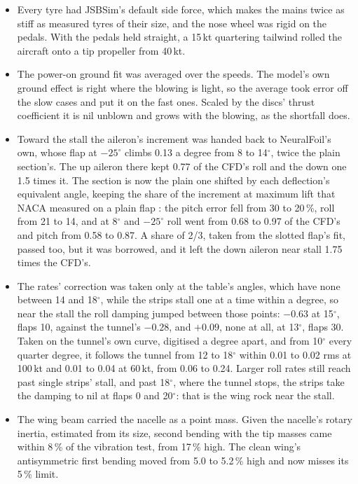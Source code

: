 \documentclass[10pt,a4paper,twocolumn]{article}
\begin{document}
\begin{itemize}
\item Every tyre had JSBSim's default side force, which makes the mains twice as stiff as measured tyres of their size, and the nose wheel was rigid on the pedals. With the pedals held straight, a 15\,kt quartering tailwind rolled the aircraft onto a tip propeller from 40\,kt.
\item The power-on ground fit was averaged over the speeds. The model's own ground effect is right where the blowing is light, so the average took error off the slow cases and put it on the fast ones. Scaled by the discs' thrust coefficient it is nil unblown and grows with the blowing, as the shortfall does.
\item Toward the stall the aileron's increment was handed back to NeuralFoil's own, whose flap at $-25^\circ$ climbs 0.13 a degree from 8 to 14$^\circ$, twice the plain section's. The up aileron there kept 0.77 of the CFD's roll and the down one 1.5 times it. The section is now the plain one shifted by each deflection's equivalent angle, keeping the share of the increment at maximum lift that NACA measured on a plain flap \cite{n661}: the pitch error fell from 30 to 20\,\%, roll from 21 to 14, and at 8$^\circ$ and $-25^\circ$ roll went from 0.68 to 0.97 of the CFD's and pitch from 0.58 to 0.87. A share of 2/3, taken from the slotted flap's fit, passed too, but it was borrowed, and it left the down aileron near stall 1.75 times the CFD's.
\item The rates' correction was taken only at the table's angles, which have none between 14 and 18$^\circ$, while the strips stall one at a time within a degree, so near the stall the roll damping jumped between those points: $-0.63$ at 15$^\circ$, flaps 10, against the tunnel's $-0.28$, and $+0.09$, none at all, at 13$^\circ$, flaps 30. Taken on the tunnel's own curve, digitised a degree apart, and from 10$^\circ$ every quarter degree, it follows the tunnel from 12 to 18$^\circ$ within 0.01 to 0.02 rms at 100\,kt and 0.01 to 0.04 at 60\,kt, from 0.06 to 0.24. Larger roll rates still reach past single strips' stall, and past 18$^\circ$, where the tunnel stops, the strips take the damping to nil at flaps 0 and 20$^\circ$: that is the wing rock near the stall.
\item The wing beam carried the nacelle as a point mass. Given the nacelle's rotary inertia, estimated from its size, second bending with the tip masses came within 8\,\% of the vibration test, from 17\,\% high. The clean wing's antisymmetric first bending moved from 5.0 to 5.2\,\% high and now misses its 5\,\% limit.
\end{itemize}
\end{document}
